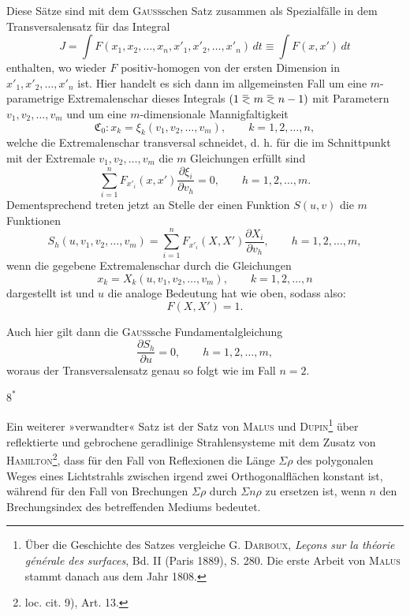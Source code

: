Diese Sätze sind mit dem \textsc{Gauss}schen Satz zusammen als Spezialfälle in
dem Transversalensatz für das Integral
\begin{equation*}\tag{19}
J=\int F(x_1,x_2,\ldots,x_n,x'_1,x'_2,\ldots,x'_n)\,dt\equiv\int F(x,x')\,dt
\end{equation*}
enthalten, wo wieder $F$ positiv-homogen von der ersten Dimension in
$x'_1,x'_2,\ldots,x'_n$ ist. Hier handelt es sich dann im allgemeinsten Fall um eine
$m$-parametrige Extremalenschar dieses Integrals $(1\BolzaEqualAboveLess m\BolzaEqualAboveLess n-1)$ mit Parametern
$v_1,v_2,\ldots,v_m$ und um eine $m$-dimensionale Mannigfaltigkeit
\[
\mathfrak C_0:x_k=\xi_k(v_1,v_2,\ldots,v_m),\qquad k=1,2,\ldots,n,
\]
welche die Extremalenschar transversal schneidet, d. h. für die im Schnittpunkt
mit der Extremale $v_1,v_2,\ldots,v_m$ die $m$ Gleichungen erfüllt sind
\[
\sum_{i=1}^n F_{x'_i}(x,x')\frac{\partial\xi_i}{\partial v_h}=0,\qquad h=1,2,\ldots,m.
\]
Dementsprechend treten jetzt an Stelle der einen Funktion $S(u,v)$ die $m$
Funktionen
\begin{equation*}\tag{20}
S_h(u,v_1,v_2,\ldots,v_m)=\sum_{i=1}^n F_{x'_i}(X,X')\frac{\partial X_i}{\partial v_h},\qquad h=1,2,\ldots,m,
\end{equation*}
wenn die gegebene Extremalenschar durch die Gleichungen
\[
x_k=X_k(u,v_1,v_2,\ldots,v_m),\qquad k=1,2,\ldots,n
\]
dargestellt ist und $u$ die analoge Bedeutung hat wie oben, sodass also:
\[
F(X,X')=1.
\]

Auch hier gilt dann die \textsc{Gauss}sche Fundamentalgleichung
\begin{equation*}\tag{21}
\frac{\partial S_h}{\partial u}=0,\qquad h=1,2,\ldots,m,
\end{equation*}
woraus der Transversalensatz genau so folgt wie im Fall $n=2$.
\par\smallskip\noindent\hfill$8^*$\par
\clearpage{}
\noindent\hspace*{\parindent}Ein weiterer »verwandter« Satz ist der Satz von \textsc{Malus} und \textsc{Dupin}\footnote{Über die Geschichte des Satzes vergleiche G. \textsc{Darboux}, \textit{Leçons sur la théorie générale des surfaces},
Bd. II (Paris 1889), S. 280. Die erste Arbeit von \textsc{Malus} stammt danach aus dem Jahr 1808.} über
reflektierte und gebrochene geradlinige Strahlensysteme mit dem Zusatz von
\textsc{Hamilton}\footnote{loc. cit. 9), Art. 13.}, dass für den Fall von Reflexionen die Länge $\Sigma\rho$ des polygonalen
Weges eines Lichtstrahls zwischen irgend zwei Orthogonalflächen konstant ist,
während für den Fall von Brechungen $\Sigma\rho$ durch $\Sigma n\rho$ zu ersetzen ist, wenn $n$
den Brechungsindex des betreffenden Mediums bedeutet.
\par\clearpage\endgroup
